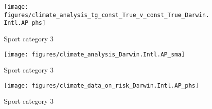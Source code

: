 \documentclass[11pt]{article}
\begin{document}
%
%
%
    \begin{figure}[htb!]
        \centering
        \texttt{[image: figures/climate\_analysis\_tg\_const\_True\_v\_const\_True\_Darwin.Intl.AP\_phs]}
        \caption{Sport category 3}
    \end{figure}
    \begin{figure}[htb!]
            \centering
            \texttt{[image: figures/climate\_analysis\_Darwin.Intl.AP\_sma]}
            \caption{Sport category 3}
        \end{figure}
    \begin{figure}[htb!]
            \centering
            \texttt{[image: figures/climate\_data\_on\_risk\_Darwin.Intl.AP\_phs]}
            \caption{Sport category 3}
        \end{figure}
%
\end{document}
